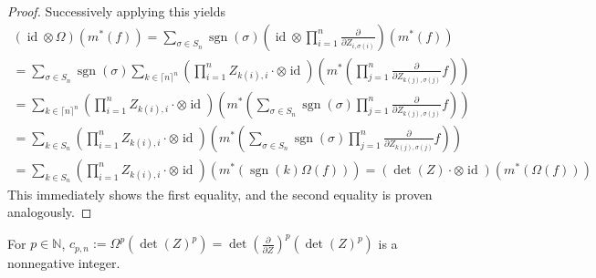 \begin{proof}
  Successively applying this yields
  \begin{equation}
    \begin{aligned}
      \left( \operatorname{id} \otimes \Omega \right) \left( m^\ast \left( f \right) \right)
      = \sum_{\sigma \in S_n} \operatorname{sgn} \left( \sigma \right) \left( \operatorname{id} \otimes \prod_{i=1}^n \frac{\partial}{\partial Z_{i,\sigma \left( i \right)}} \right) \left( m^\ast \left( f \right) \right) \\
      = \sum_{\sigma \in S_n} \operatorname{sgn} \left( \sigma \right) \sum_{k \in \lceil n \rceil^n} \left( \prod_{i=1}^n Z_{k(i),i} \cdot \otimes \operatorname{id} \right) \left( m^\ast \left( \prod_{j=1}^n \frac{\partial}{\partial Z_{k(j),\sigma (j)}} f \right) \right) \\
      = \sum_{k \in \lceil n \rceil^n} \left( \prod_{i=1}^n Z_{k(i),i} \cdot \otimes \operatorname{id} \right) \left( m^\ast \left( \sum_{\sigma \in S_n} \operatorname{sgn} \left( \sigma \right) \prod_{j=1}^n \frac{\partial}{\partial Z_{k(j),\sigma (j)}} f \right) \right) \\
      = \sum_{k \in S_n} \left( \prod_{i=1}^n Z_{k(i),i} \cdot \otimes \operatorname{id} \right) \left( m^\ast \left( \sum_{\sigma \in S_n} \operatorname{sgn} \left( \sigma \right) \prod_{j=1}^n \frac{\partial}{\partial Z_{k(j),\sigma (j)}} f \right) \right) \\
      = \sum_{k \in S_n} \left( \prod_{i=1}^n Z_{k(i),i} \cdot \otimes \operatorname{id} \right) \left( m^\ast \left( \operatorname{sgn} (k) \Omega (f) \right) \right)
      = \left( \operatorname{det} (Z) \cdot \otimes \operatorname{id} \right) \left( m^\ast \left( \Omega (f) \right) \right)
    \end{aligned}
  \end{equation}
  This immediately shows the first equality, and the second equality is proven analogously.
\end{proof}

\begin{lemma}
  For $p \in \mathbb{N} $, $ c_{p,n} := \Omega^p \left( \operatorname{det} (Z)^p \right) = \operatorname{det} \left( \frac{\partial}{\partial Z}\right)^p \left( \operatorname{det} (Z)^p \right)$ is a nonnegative integer.
\end{lemma}

